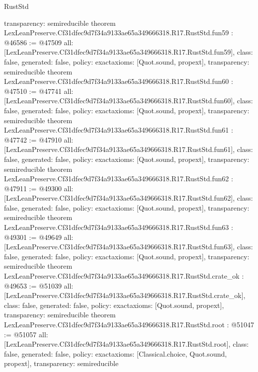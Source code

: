 \begin{lexlean}{RustStd}
\begin{coremodule}
{  transparency: semireducible
}
theorem LexLeanPreserve.Cf31dfec9d7f34a9133ae65a349666318.R17.RustStd.fun59 : @46586 := @47509 {
  all: [LexLeanPreserve.Cf31dfec9d7f34a9133ae65a349666318.R17.RustStd.fun59],
  class: false,
  generated: false,
  policy: exact{axioms: [Quot.sound, propext]},
  transparency: semireducible
}
theorem LexLeanPreserve.Cf31dfec9d7f34a9133ae65a349666318.R17.RustStd.fun60 : @47510 := @47741 {
  all: [LexLeanPreserve.Cf31dfec9d7f34a9133ae65a349666318.R17.RustStd.fun60],
  class: false,
  generated: false,
  policy: exact{axioms: [Quot.sound, propext]},
  transparency: semireducible
}
theorem LexLeanPreserve.Cf31dfec9d7f34a9133ae65a349666318.R17.RustStd.fun61 : @47742 := @47910 {
  all: [LexLeanPreserve.Cf31dfec9d7f34a9133ae65a349666318.R17.RustStd.fun61],
  class: false,
  generated: false,
  policy: exact{axioms: [Quot.sound, propext]},
  transparency: semireducible
}
theorem LexLeanPreserve.Cf31dfec9d7f34a9133ae65a349666318.R17.RustStd.fun62 : @47911 := @49300 {
  all: [LexLeanPreserve.Cf31dfec9d7f34a9133ae65a349666318.R17.RustStd.fun62],
  class: false,
  generated: false,
  policy: exact{axioms: [Quot.sound, propext]},
  transparency: semireducible
}
theorem LexLeanPreserve.Cf31dfec9d7f34a9133ae65a349666318.R17.RustStd.fun63 : @49301 := @49649 {
  all: [LexLeanPreserve.Cf31dfec9d7f34a9133ae65a349666318.R17.RustStd.fun63],
  class: false,
  generated: false,
  policy: exact{axioms: [Quot.sound, propext]},
  transparency: semireducible
}
theorem LexLeanPreserve.Cf31dfec9d7f34a9133ae65a349666318.R17.RustStd.crate_ok : @49653 := @51039 {
  all: [LexLeanPreserve.Cf31dfec9d7f34a9133ae65a349666318.R17.RustStd.crate_ok],
  class: false,
  generated: false,
  policy: exact{axioms: [Quot.sound, propext]},
  transparency: semireducible
}
theorem LexLeanPreserve.Cf31dfec9d7f34a9133ae65a349666318.R17.RustStd.root : @51047 := @51057 {
  all: [LexLeanPreserve.Cf31dfec9d7f34a9133ae65a349666318.R17.RustStd.root],
  class: false,
  generated: false,
  policy: exact{axioms: [Classical.choice, Quot.sound, propext]},
  transparency: semireducible
}


\end{coremodule}
\end{lexlean}
